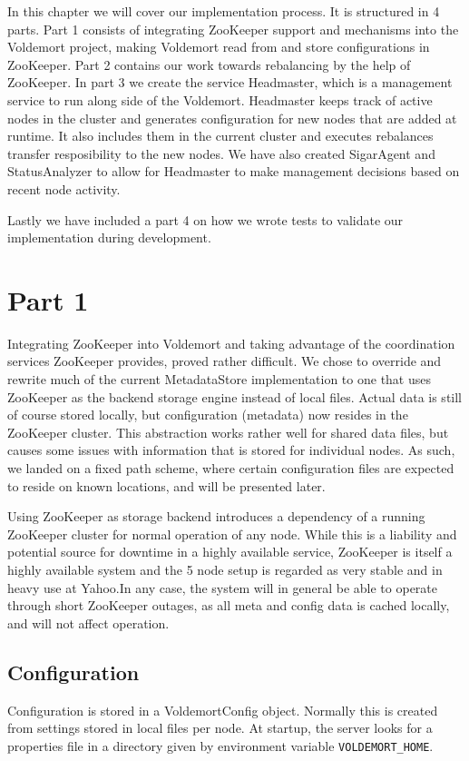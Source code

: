 
In this chapter we will cover our implementation process. It is structured in 4 parts. Part 1 consists of integrating ZooKeeper support and mechanisms into the Voldemort project, making Voldemort read from and store configurations in ZooKeeper. Part 2 contains our work towards rebalancing by the help of ZooKeeper. In part 3 we create the service Headmaster, which is a management service to run along side of the Voldemort. Headmaster keeps track of active nodes in the cluster and generates configuration for new nodes that are added at runtime. It also includes them in the current cluster and executes rebalances transfer resposibility to the new nodes. We have also created SigarAgent and StatusAnalyzer to allow for Headmaster to make management decisions based on recent node activity.

Lastly we have included a part 4 on how we wrote tests to validate our implementation during development.

\section{Part 1}
Integrating ZooKeeper into Voldemort and taking advantage of the coordination services ZooKeeper provides, proved rather difficult.
We chose to override and rewrite much of the current MetadataStore implementation to one that uses ZooKeeper as the backend storage engine instead of local files. 
Actual data is still of course stored locally, but configuration (metadata) now resides in the ZooKeeper cluster.
This abstraction works rather well for shared data files, but causes some issues with information that is stored for individual nodes. 
As such, we landed on a fixed path scheme, where certain configuration files are expected to reside on known locations, and will be presented later.

Using ZooKeeper as storage backend introduces a dependency of a running ZooKeeper cluster for normal operation of any node. While this is a liability and potential source for downtime in a highly available service, ZooKeeper is itself a highly available system and the 5 node setup is regarded as very stable and in heavy use at Yahoo\cite{zookeeperpaper}.In any case, the system will in general be able to operate through short ZooKeeper outages, as all meta and config data is cached locally, and will not affect operation. 

\subsection{Configuration}
Configuration is stored in a VoldemortConfig object. Normally this is created from settings stored in local files per node. At startup, the server looks for a properties file in a directory given by environment variable \texttt{VOLDEMORT\_HOME}. 

